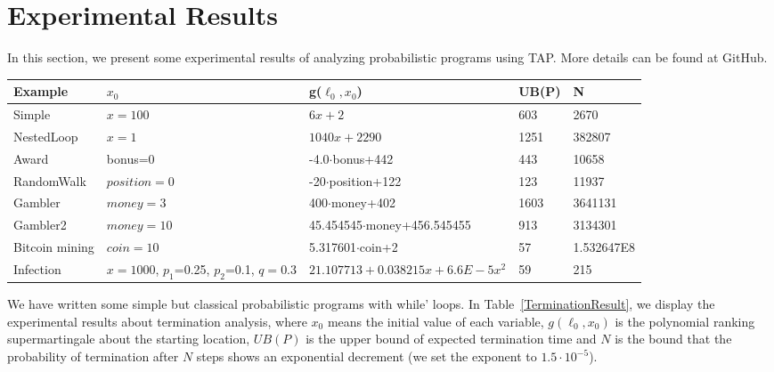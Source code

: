 \documentclass[sigconf,review, anonymous]{acmart}
\begin{document}
\section{Experimental Results}
In this section, we present some experimental results of analyzing probabilistic programs using TAP. More details can be found at GitHub.

\begin{table*}
	\caption{Experimental results: termination analysis}  
	\label{TerminationResult} 
	\begin{center}  
		\begin{tabular}{|l|l|l|l|l|}  
			\hline  	
			Example & $x_0$ & g($\ell_0,x_0$) & UB(P) & N\\ \hline  	
			Simple & $x=100$  & $6x+2$ & 603 & 2670 \\ \hline  		
			NestedLoop & $x=1$ & $1040x+2290$ & 1251 & 382807 \\  \hline  
			Award & bonus=0 & -4.0$\cdot$bonus+442& 443 &10658 \\  \hline  
			RandomWalk & $position=0$ & -20$\cdot$position+122 & 123 & 11937 \\  \hline  
			Gambler& $money=3$ & 400$\cdot$money+402& 1603 & 3641131 \\ \hline  		 
			Gambler2 & $money=10$ & 45.454545$\cdot$money+456.545455 & 913 & 3134301 \\  \hline  
			Bitcoin mining & $coin=10$ & 5.317601$\cdot$coin+2 & 57 & 1.532647E8 \\  \hline 
			Infection & $x=1000$, $p_1$=0.25, $p_2$=0.1, $q=0.3$ & $21.107713+0.038215x+6.6E-5x^2$& 59 & 215 \\  \hline  
		\end{tabular}  
	\end{center}  
\end{table*}

We have written some simple but classical probabilistic programs with while' loops. In Table~\ref{TerminationResult}, we display the experimental results about termination analysis, where $x_0$ means the initial value of each variable, $g(\ell_0,x_0)$ is the polynomial ranking supermartingale about the starting location, $UB(P)$ is the upper bound of expected termination time and $N$ is the bound that the probability of termination after $N$ steps shows an exponential decrement (we set the exponent to  $1.5 \cdot 10^{-5}$).
\end{document}
